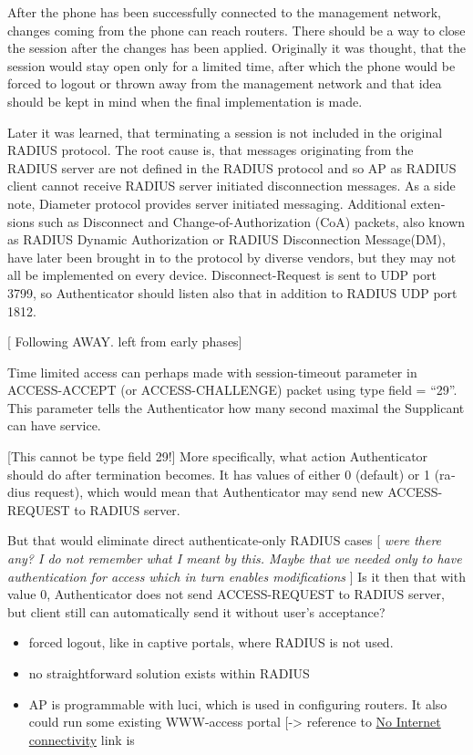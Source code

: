 \documentclass[12pt,a4paper,english]{tutthesis}
\begin{document}
\begin{otherlanguage}{english}
After the phone has been successfully connected to the management network,
changes coming from 
the phone can reach routers.  There should be a way to close the session after
the changes has been applied. Originally it was thought, that the session
would stay open only for a limited time, after which the phone would be forced to
logout or thrown away from the management network and that idea should be
kept in mind when the final implementation is made.





Later it was learned, that terminating a session is not included in the original RADIUS protocol.
The root cause is, that messages originating from the RADIUS server
are not defined in the RADIUS protocol and so AP as RADIUS client cannot
receive RADIUS server initiated disconnection messages. 
As a side note, Diameter protocol provides server initiated messaging.
Additional
extensions such as Disconnect and Change-of-Authorization (CoA)
packets, also known as RADIUS Dynamic Authorization or RADIUS
Disconnection Message(DM), have later been brought in\cite{rfc5176}
to the protocol by diverse vendors, but they may not all be implemented on
every device.
Disconnect-Request is sent to UDP port 3799, so Authenticator should
listen also that in addition to RADIUS UDP port 1812.






[ Following AWAY. left from early phases]

Time limited access can perhaps made with session-timeout parameter
in ACCESS-ACCEPT (or ACCESS-CHALLENGE) packet using type field = ``29''.
This parameter tells the Authenticator how many second maximal the Supplicant
can have service. 

[This cannot be type field 29!]  More specifically, what action
Authenticator should do after termination becomes. It has values of
either 0 (default) or 1 (radius request), which would mean that
Authenticator may send new ACCESS-REQUEST to RADIUS server.

But that would eliminate direct authenticate-only RADIUS cases
  [ \emph{were there}
 \emph{any? I do not remember what I meant}
 \emph{by this. Maybe that we needed only}
 \emph{to have authentication for access} 
 \emph{which in turn enables modifications} ]
Is it then that with value 0, Authenticator does not send
ACCESS-REQUEST to RADIUS server, but client still can automatically send it without 
user's acceptance?
\begin{itemize}
\item forced logout, like in captive portals, where RADIUS is not used.
\item no straightforward solution exists within RADIUS
\item AP is programmable with luci, which is used in configuring routers. It also could run some existing WWW-access
portal [-> reference to \hyperref[text:nointernet]{No Internet connectivity} link is
\end{itemize}









\end{otherlanguage}
\end{document}
